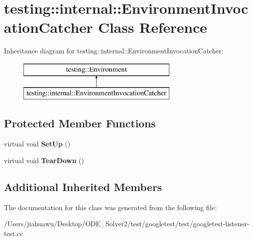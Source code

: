 \hypertarget{classtesting_1_1internal_1_1_environment_invocation_catcher}{}\section{testing\+:\+:internal\+:\+:Environment\+Invocation\+Catcher Class Reference}
\label{classtesting_1_1internal_1_1_environment_invocation_catcher}
Inheritance diagram for testing\+:\+:internal\+:\+:Environment\+Invocation\+Catcher\+:\begin{figure}[H]
\begin{center}
\leavevmode
\includegraphics[height=2.000000cm]{classtesting_1_1internal_1_1_environment_invocation_catcher}
\end{center}
\end{figure}
\subsection*{Protected Member Functions}
\begin{DoxyCompactItemize}
\item 
\mbox{\label{classtesting_1_1internal_1_1_environment_invocation_catcher_a325365b0ecfa71a4a767d7a1817c9663}} 
virtual void {\bfseries Set\+Up} ()
\item 
\mbox{\label{classtesting_1_1internal_1_1_environment_invocation_catcher_afc89ee0a8e32e6746a89fcc1682f62e9}} 
virtual void {\bfseries Tear\+Down} ()
\end{DoxyCompactItemize}
\subsection*{Additional Inherited Members}


The documentation for this class was generated from the following file\+:\begin{DoxyCompactItemize}
\item 
/\+Users/jiahuawu/\+Desktop/\+O\+D\+E\+\_\+\+Solver2/test/googletest/test/googletest-\/listener-\/test.\+cc\end{DoxyCompactItemize}
